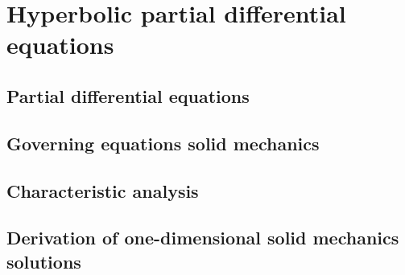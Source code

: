 \chapter{Hyperbolic partial differential equations}
\newpage
\section{Partial differential equations}
\label{sec:PDEs}


\section{Governing equations solid mechanics}
\label{sec:solidMech_equations}



\section{Characteristic analysis}
\label{sec:characteristic_analysis}
%


\section{Derivation of one-dimensional solid mechanics solutions}
\label{sec:analytical_results}
%




